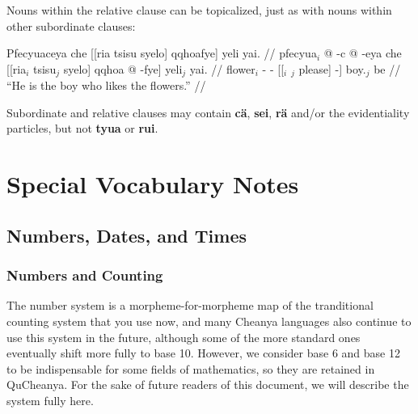 \documentclass{article}
\begin{document}
Nouns within the relative clause can be topicalized, just as with nouns within other subordinate clauses:

\ex[lingstyle=QuCheanya] \begingl
\glpreamble Pfecyuaceya che [[ria tsisu syelo] qqhoafye] yeli yai. //
\gla pfecyua$_i$ @ -c @ -eya che [[ria$_i$ tsisu$_j$ syelo] qqhoa @ -fye] yeli$_j$ yai. //
\glb flower$_i$ - -  [[$_i$ $_j$ please]  -] boy.$_j$ be //
\glft ``He is the boy who likes the flowers.'' //
\endgl \xe

Subordinate and relative clauses may contain \textbf{c\"a}, \textbf{sei}, \textbf{r\"a} and/or the evidentiality particles, but not \textbf{tyua} or \textbf{rui}.

\section{Special Vocabulary Notes}
\subsection{Numbers, Dates, and Times}
\subsubsection{Numbers and Counting}

The number system is a morpheme-for-morpheme map of the tranditional counting system that you use now, and many Cheanya languages also continue to use this system in the future, although some of the more standard ones eventually shift more fully to base 10.  However, we consider base 6 and base 12 to be indispensable for some fields of mathematics, so they are retained in QuCheanya.  For the sake of future readers of this document, we will describe the system fully here.
\end{document}
